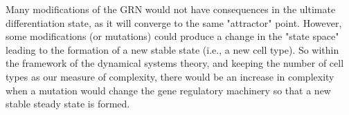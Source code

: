 Many modifications of the GRN would not have consequences in the ultimate differentiation state, as it will converge to the same "attractor" point.
However, some modifications (or mutations) could produce a change in the "state space" leading to the formation of a new stable state (i.e., a new cell type).
So within the framework of the dynamical systems theory, and keeping the number of cell types as our measure of complexity, there would be an increase in complexity when a mutation would change the gene regulatory machinery so that a new stable steady state is formed.




